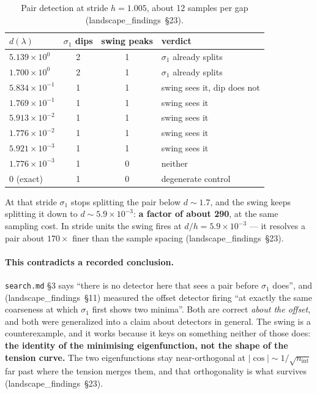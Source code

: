 \documentclass[11pt]{article}
\newcommand{\file}[1]{\texttt{#1}}
\newcommand{\lf}[1]{(landscape\_findings~\S#1)}
\newcommand{\sig}{\sigma}
\newcommand{\sione}{\sig_1}
\newcommand{\lam}{\lambda}
\begin{document}
\begin{table}[htbp]
\centering
\caption{Pair detection at stride $h = 1.005$, about 12 samples per gap \lf{23}.}
\label{tab:swingpair}
\begin{tabular}{lccl}
\toprule
$d(\lam)$ & $\sione$ dips & swing peaks & verdict \\
\midrule
$5.139\times10^{0}$  & 2 & 1 & $\sione$ already splits \\
$1.700\times10^{0}$  & 2 & 1 & $\sione$ already splits \\
$5.834\times10^{-1}$ & 1 & 1 & swing sees it, dip does not \\
$1.769\times10^{-1}$ & 1 & 1 & swing sees it \\
$5.913\times10^{-2}$ & 1 & 1 & swing sees it \\
$1.776\times10^{-2}$ & 1 & 1 & swing sees it \\
$5.921\times10^{-3}$ & 1 & 1 & swing sees it \\
$1.776\times10^{-3}$ & 1 & 0 & neither \\
$0$ (exact)          & 1 & 0 & degenerate control \\
\bottomrule
\end{tabular}
\end{table}

At that stride $\sione$ stops splitting the pair below $d \sim 1.7$, and the swing keeps splitting
it down to $d \sim 5.9\times10^{-3}$: \textbf{a factor of about 290}, at the same sampling cost.
In stride units the swing fires at $d/h = 5.9\times10^{-3}$ --- it resolves a pair about
$170\times$ finer than the sample spacing \lf{23}.

\paragraph{This contradicts a recorded conclusion.} \file{search.md} \S3 says ``there is no
detector here that sees a pair before $\sione$ does'', and \lf{11} measured the offset detector
firing ``at exactly the same coarseness at which $\sione$ first shows two minima''. Both are
correct \emph{about the offset}, and both were generalized into a claim about detectors in
general. The swing is a counterexample, and it works because it keys on something neither of those
does: \textbf{the identity of the minimising eigenfunction, not the shape of the tension curve.}
The two eigenfunctions stay near-orthogonal at $|\cos| \sim 1/\sqrt{n_{\mathrm{int}}}$ far past
where the tension merges them, and that orthogonality is what survives \lf{23}.
\end{document}

